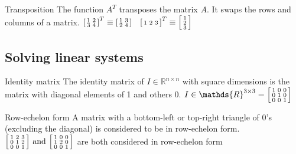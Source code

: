 \documentclass{article}
\begin{document}
\begin{knBox}[]{Transposition}
    The function $A^T$ transposes the matrix $A$. It swaps the rows and columns of a matrix.
    \tcblower
    $\begin{bsmallmatrix}
        1&2\\3&4
    \end{bsmallmatrix}^T \equiv \begin{bsmallmatrix}
        1&3\\2&4
    \end{bsmallmatrix}\quad \begin{bsmallmatrix}
        1&2&3
    \end{bsmallmatrix}^T \equiv \begin{bsmallmatrix}
        1\\2\\3
    \end{bsmallmatrix}$
\end{knBox}

\subsection{Solving linear systems}
\begin{knBox}[]{Identity matrix}
    The identity matrix of $I\in \mathds{R}^{n\times n}$ with square dimensions is the matrix with diagonal elements of 1 and others 0.
    \tcblower
    $I\in \mathds{R}^{3\times 3}=\begin{bsmallmatrix}
        1&0&0\\0&1&0\\0&0&1
    \end{bsmallmatrix}$
\end{knBox}
\begin{knBox}[]{Row-echelon form}
    A matrix with a bottom-left or top-right triangle of 0's (excluding the diagonal) is considered to be in row-echelon form.
    \tcblower
    $\begin{bsmallmatrix}
        1&2&3\\0&1&2\\0&0&1
    \end{bsmallmatrix}\text{ and }\begin{bsmallmatrix}
        1&0&0\\1&2&0\\0&0&1
    \end{bsmallmatrix}$ are both considered in row-echelon form
\end{knBox}
\end{document}
